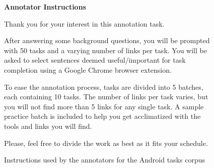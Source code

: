 

\begin{figure}[!htb]
\begin{mdframed}[backgroundcolor=gray!05] 
\begin{footnotesize}

{\large \textbf{Annotator Instructions}} \bigskip


Thank you for your interest in this annotation task. \bigskip
 
After answering some background questions, you will be prompted with 50 tasks and a varying number of links per task. You will be asked to select sentences deemed useful/important for task completion using a Google Chrome browser extension. \bigskip


To ease the annotation process,  tasks are divided into 5 batches, each containing 10 tasks. The number of links per task varies, but you will not find more than 5 links for any single task. A sample practice batch is included to help you get acclimatized with the tools and links you will find. \bigskip


Please, feel free to divide the work as best as it fits your schedule.


\end{footnotesize}
\end{mdframed}
\caption{Instructions used by the annotators for the Android tasks corpus}
\end{figure}

\vfill
